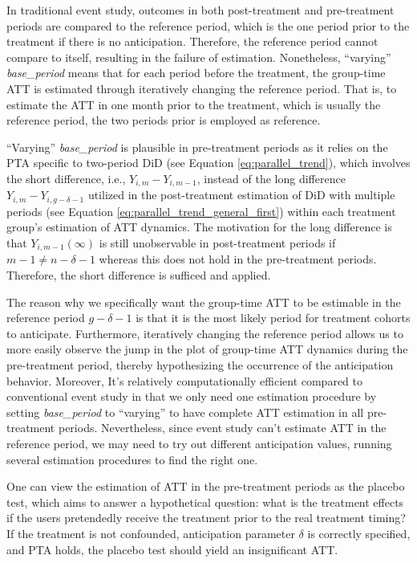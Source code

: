In traditional event study, outcomes in both post-treatment and pre-treatment periods are compared to the reference period, which is the one period prior to the treatment if there is no anticipation.
Therefore, the reference period cannot compare to itself, resulting in the failure of estimation.
Nonetheless, ``varying'' \textit{base\_period} means that for each period before the treatment, the group-time ATT is estimated through iteratively changing the reference period.
That is, to estimate the ATT in one month prior to the treatment, which is usually the reference period, the two periods prior is employed as reference.

``Varying'' \textit{base\_period} is plausible in pre-treatment periods as it relies on the PTA specific to two-period DiD (see Equation \ref{eq:parallel_trend}), which involves the short difference, i.e., $Y_{i, m} - Y_{i, m-1}$, instead of the long difference $Y_{i, m} - Y_{i, g-\delta-1}$ utilized in the post-treatment estimation of DiD with multiple periods (see Equation \ref{eq:parallel_trend_general_first}) within each treatment group's estimation of ATT dynamics.
The motivation for the long difference is that \( Y_{i, m-1}(\infty) \) is still unobservable in post-treatment periods if \( m-1 \neq n-\delta-1 \) whereas this does not hold in the pre-treatment periods.
Therefore, the short difference is sufficed and applied.

The reason why we specifically want the group-time ATT to be estimable in the reference period \( g-\delta-1 \)	 is that it is the most likely period for treatment cohorts to anticipate.
Furthermore, iteratively changing the reference period allows us to more easily observe the jump in the plot of group-time ATT dynamics during the pre-treatment period, thereby hypothesizing the occurrence of the anticipation behavior.
Moreover, It's relatively computationally efficient compared to conventional event study in that we only need one estimation procedure by setting \textit{base\_period} to ``varying'' to have complete ATT estimation in all pre-treatment periods.
Nevertheless, since event study can't estimate ATT in the reference period, we may need to try out different anticipation values, running several estimation procedures to find the right one.

One can view the estimation of ATT in the pre-treatment periods as the placebo test, which aims to answer a hypothetical question: what is the treatment effects if the users pretendedly receive the treatment prior to the real treatment timing?
If the treatment is not confounded, anticipation parameter $\delta$ is correctly specified, and PTA holds, the placebo test should yield an insignificant ATT.

